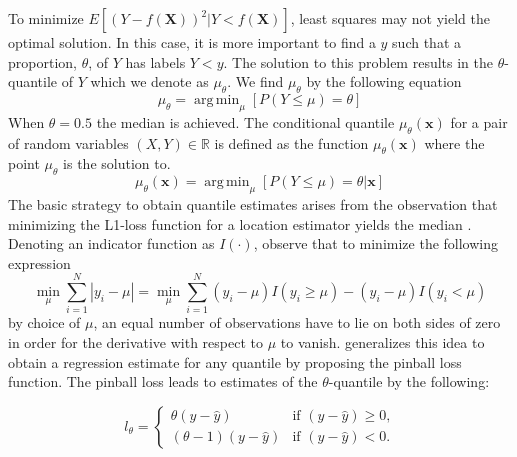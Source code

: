 \documentclass[twoside,11pt]{article}
\begin{document}
To minimize $E[(Y-f(\mathbf{X}))^2|Y<f(\mathbf{X})]$, least squares may not yield the optimal solution. In this case, it is more important to find a $y$ such that a proportion, $\theta$, of $Y$ has labels $Y<y$. The solution to this problem results in the $\theta$-quantile of $Y$ which we denote as $\mu_{\theta}$. We find $\mu_{\theta}$ by the following equation
 \begin{equation}
 \mu_{\theta}=\operatorname{arg\,min}_{\mu}[P(Y\leq \mu)=\theta]
 \end{equation}
When $\theta = 0.5$ the median is achieved. The conditional quantile $\mu_{\theta}(\mathbf{x})$ for a pair of random variables $(X,Y) \in \mathbb{R}$ is defined as the function $\mu_{\theta}(\mathbf{x}) $ where the point $\mu_{\theta}$ is the solution to.
 \begin{equation}
\mu_{\theta}(\mathbf{x})=\operatorname{arg\,min}_{\mu}[P(Y\leq \mu)=\theta|\mathbf{x}]
 \end{equation}
The basic strategy to obtain quantile estimates arises from the observation that minimizing the L1-loss function for a location estimator yields the median \citep{Hao07}. Denoting an indicator function as $I(\cdot)$, observe that to minimize the following expression
\begin{equation}\label{Eq:median minimize}
\min_{\mu}\sum_{i=1}^{N}|y_i-\mu|=\min_{\mu}\sum_{i=1}^{N}(y_i-\mu)I(y_i \geq \mu) - (y_i-\mu)I(y_i < \mu) 
 \end{equation}
by choice of $\mu$, an equal number of observations have to lie on both sides of zero in order for the derivative with respect to $\mu$ to vanish. \citet{Koenker01} generalizes this idea to obtain a regression estimate for any quantile by proposing the pinball loss function. The pinball loss leads to estimates of the $\theta$-quantile by the following:

\begin{equation}\label{Eq:pinball}
l_{\theta}=
\begin{cases} \theta (y-\hat{y}) & \text{if $(y-\hat{y})\geq 0$,}
\\
 (\theta - 1) (y-\hat{y})  &\text{if $(y-\hat{y})< 0$.}
\end{cases}
\end{equation}
\end{document}
